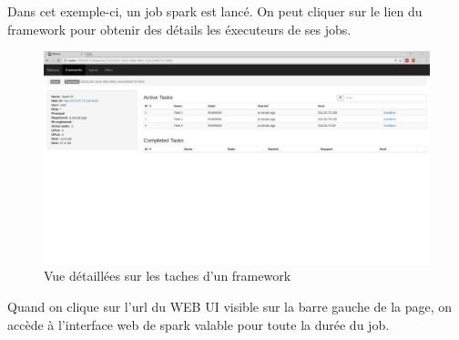 \documentclass[a4paper, 11pt, titlepage]{article}
\begin{document}
Dans cet exemple-ci, un job spark est lancé. On peut cliquer sur le lien du framework pour obtenir des détails les éxecuteurs de ses jobs.
\begin{figure}[H]
    \centering
    \centerline{\includegraphics[scale=0.23]{res/tasks.png}}
    \caption{Vue détaillées sur les taches d'un framework}
\end{figure}
Quand on clique sur l'url du WEB UI visible sur la barre gauche de la page, on accède à l'interface web de spark valable pour toute la durée du job.
\newpage
\end{document}

